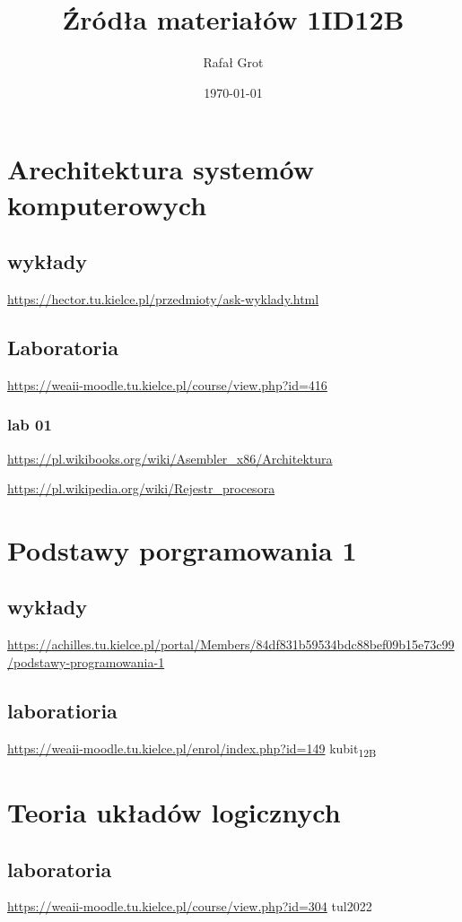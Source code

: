 \documentclass[11pt]{article}
\author{Rafał Grot}
\date{\today}
\title{Źródła materiałów 1ID12B}
\begin{document}
\maketitle
\tableofcontents


\section{Arechitektura systemów komputerowych}
\label{sec:org7ce1fcb}
\subsection{wykłady}
\label{sec:org85644bd}
\url{https://hector.tu.kielce.pl/przedmioty/ask-wyklady.html}
\subsection{Laboratoria}
\label{sec:org41ec149}
\url{https://weaii-moodle.tu.kielce.pl/course/view.php?id=416}
\subsubsection{lab 01}
\label{sec:org0850f27}
\url{https://pl.wikibooks.org/wiki/Asembler\_x86/Architektura}

\url{https://pl.wikipedia.org/wiki/Rejestr\_procesora}
\section{Podstawy porgramowania 1}
\label{sec:org3eb33f3}
\subsection{wykłady}
\label{sec:org0274104}
\url{https://achilles.tu.kielce.pl/portal/Members/84df831b59534bdc88bef09b15e73c99/podstawy-programowania-1}
\subsection{laboratioria}
\label{sec:org81fa073}
\url{https://weaii-moodle.tu.kielce.pl/enrol/index.php?id=149} kubit\textsubscript{12B}
\section{Teoria układów logicznych}
\label{sec:org161dd7e}
\subsection{laboratoria}
\label{sec:org3e0f2f5}
\url{https://weaii-moodle.tu.kielce.pl/course/view.php?id=304} tul2022
\end{document}
